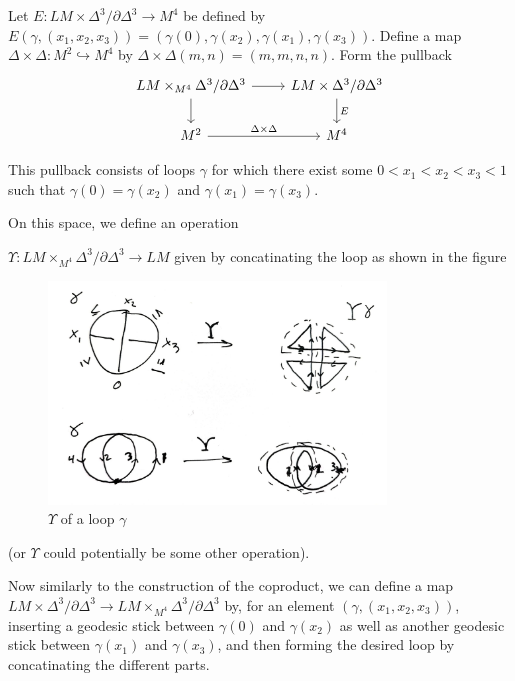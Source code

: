 \documentclass[reqno]{amsart}
\theoremstyle{definition}
\theoremstyle{remark}
\begin{document}
Let $E \colon
LM \times \Delta^3 / \partial \Delta^3 \to 
M^{4}$ be defined by
$E\left(\gamma, \left( x_1,x_2,x_3 \right)  \right) = 
\left( \gamma(0), \gamma(x_2), \gamma(x_1),
\gamma(x_3)\right)  $. Define
a map $\Delta \times \Delta\colon M^2 \hookrightarrow M^{4}$ by
$\Delta \times \Delta \left( m,n \right) = 
\left( m,m,n,n \right) $.
Form the pullback
\begin{equation*}
\begin{tikzcd}
    LM \times_{M^{4}} \Delta^3 / \partial \Delta^3
    \ar[r] \ar[d] & LM \times \Delta^3 / \partial \Delta^3
    \ar[d, "E"] \\
    M^2 \ar[r, "\Delta \times \Delta"] & M^{4}
\end{tikzcd}
\end{equation*}

This pullback consists of loops $\gamma$ for which
there exist some
$0 < x_1 < x_2 < x_3 < 1$ such that
$\gamma (0) = \gamma(x_2)$ and
$\gamma(x_1) = \gamma(x_3)$.

On this space, we define an operation

$\Upsilon \colon LM \times_{M^{4}} \Delta^3 / \partial \Delta^3 \to 
LM$ given by
concatinating the loop as shown in the figure

\begin{figure}[htpb]
    \centering
    \includegraphics[width=0.8\textwidth]{Figures/UGWINZKQ.jpeg}
    \caption{$\Upsilon$ of a loop $\gamma$}
    \label{fig:Figures-UGWINZKQ-jpeg}
\end{figure}



(or $\Upsilon$ could potentially be some other operation).


Now similarly to the construction of the coproduct, we can define a map
$LM \times \Delta^{3} /\partial \Delta^3 \to LM \times_{M^{4}} \Delta^{3}
/ \partial \Delta^3$ by,
for an element
$\left( \gamma, \left( x_1,x_2,x_3 \right)  \right) $, inserting
a geodesic stick between $\gamma(0)$ and $\gamma(x_2)$ as well
as another geodesic stick between $\gamma(x_1)$ and 
$\gamma(x_3)$, and then forming the desired loop by concatinating
the different parts.
\end{document}
